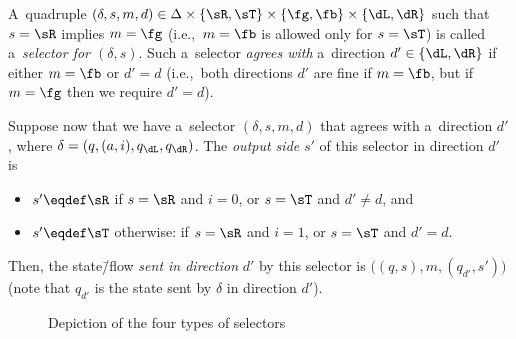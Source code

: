 \documentclass{lmcs}
\numberwithin{equation}{section}
\numberwithin{figure}{section}
\begin{document}
A~quadruple $(\delta,s,m,d)\in\Delta\times\{\sR,\sT\}\times\{\fg,\fb\}\times\{\dL,\dR\}$ such that $s=\sR$ implies $m=\fg$ (i.e.,~$m=\fb$ is allowed only for $s=\sT$)
is called a~\emph{selector for $(\delta,s)$}.
Such a~selector \emph{agrees with} a~direction $d'\in\{\dL,\dR\}$ if either $m=\fb$ or $d'=d$ (i.e.,~both directions $d'$ are fine if $m=\fb$, but if $m=\fg$ then we require $d'=d$).

Suppose now that we have a~selector $(\delta,s,m,d)$ that agrees with a~direction $d'$, where $\delta=(q,(a,i),q_\dL,q_\dR)$.
The \emph{output side} $s'$ of this selector in direction $d'$ is
\begin{itemize}
\item	$s'\eqdef\sR$ if $s=\sR$ and $i=0$, or $s=\sT$ and $d'\neq d$, and
\item	$s'\eqdef\sT$ otherwise: if $s=\sR$ and $i=1$, or $s=\sT$ and $d'=d$.
\end{itemize}
Then, the state\=/flow \emph{sent in direction} $d'$ by this selector is $\big((q,s),m,(q_{d'},s')\big)$ (note that $q_{d'}$ is the state sent by $\delta$ in direction $d'$).


\begin{figure}
\begin{center}
\end{center}
\caption{Depiction of the four types of selectors}
\label{fig:selectors}
\end{figure}
\end{document}
